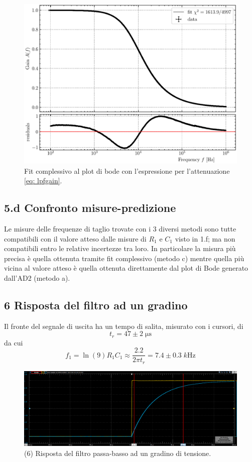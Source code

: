 \documentclass[10pt, a4paper, italian]{article}
\begin{document}
\begin{figure}[htb]
\centering
\includegraphics[scale=0.7]{lpfbodefit}
\caption{Fit complessivo al plot di bode con l'espressione per l'attenuazione
\eqref{eq: lpfgain}.\label{fig: lpfbodefit}}
\end{figure}


\subsection*{5.d Confronto misure-predizione}
Le misure delle frequenze di taglio trovate con i 3 diversi metodi sono tutte
compatibili con il valore atteso dalle misure di $R_1$ e $C_1$ visto in 1.f;
ma non compatibili entro le relative incertezze tra loro.
In particolare la misura più precisa è quella ottenuta tramite fit complessivo
(metodo c) mentre quella più vicina al valore atteso è quella ottenuta
direttamente dal plot di Bode generato dall'AD2 (metodo a).

\subsection*{6 Risposta del filtro ad un gradino}
Il fronte del segnale di uscita ha un tempo di salita, misurato con i cursori, 
di 
\[
t_r = 47 \pm 2 \; \si{\micro\second}
\]
da cui 
\[
f_1 = \ln(9) R_1 C_1 \approx \frac{2.2}{2\pi t_r} = 7.4 \pm 0.3 \; \si{k\Hz}
\]
\begin{figure}[htb]
\centering
\includegraphics[scale=0.35]{rc2k10nF_rise}
\caption{(6) Risposta del filtro passa-basso ad un gradino di tensione.}
\end{figure}
\end{document}
